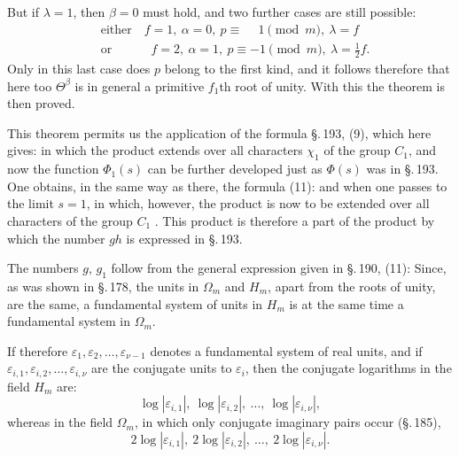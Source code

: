 But if $\lambda=1$, then $\beta=0$ must hold, and two further
cases are still possible:
\[
\begin{aligned}
&\text{either}\quad f=1,\ \alpha=0,\ p\equiv\phantom{-}1\pmod{m},\ \lambda=f\\
&\text{or}\qquad\quad\, f=2,\ \alpha=1,\ p\equiv -1\pmod{m},\ \lambda=\tfrac12 f.
\end{aligned}
\]
Only in this last case does $p$ belong to the first kind, and it
follows therefore that here too $\Theta^{\beta}$ is in general a
primitive $f_1$th root of unity. With this the theorem is then
proved.

This theorem permits us the application of the formula \S.\,193, (9),
which here gives:
in which the product extends over all characters $\chi_1$ of the
group $C_1$, and now the function $\Phi_1(s)$ can be further
developed just as $\Phi(s)$ was in \S.\,193. One obtains, in the
same way as there, the formula (11):
and when one passes to the limit $s=1$,
in which, however, the product is now to be extended over all
characters of the group $C_1$ . This product is therefore a part of the product by which
the number $gh$ is expressed in \S.\,193.

The numbers $g$, $g_1$ follow from the general expression given
in \S.\,190, (11):
Since, as was shown in \S.\,178, the units in $\Omega_m$ and
$H_m$, apart from the roots of unity, are the same, a fundamental
system of units in $H_m$ is at the same time a fundamental system
in $\Omega_m$.

If therefore $\varepsilon_1,\varepsilon_2,\dots,\varepsilon_{\nu-1}$
denotes a fundamental system of real units, and if
$\varepsilon_{i,1},\varepsilon_{i,2},\dots,\varepsilon_{i,\nu}$ are
the conjugate units to $\varepsilon_i$, then the conjugate
logarithms in the field $H_m$ are:
\[ \log|\varepsilon_{i,1}|,\ \log|\varepsilon_{i,2}|,\ \dots,\ \log|\varepsilon_{i,\nu}|, \]
whereas in the field $\Omega_m$, in which only conjugate imaginary
pairs occur (\S.\,185),
\[ 2\log|\varepsilon_{i,1}|,\ 2\log|\varepsilon_{i,2}|,\ \dots,\ 2\log|\varepsilon_{i,\nu}|. \]
